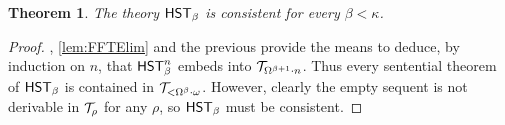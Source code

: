 \documentclass[UKenglish,cleveref,DIV=12]{scrartcl}
\newtheorem{theorem}{Theorem}[section]
\theoremstyle{definition}
\theoremstyle{definition}
\begin{document}
\begin{theorem}\label{thm:FFconsis}
 The theory $\mathsf{HST}_\beta$ is consistent for every $\beta<\kappa$.
\end{theorem}
\begin{proof}
, \cref{lem:FFTElim} and the previous  provide the means to deduce, by induction on $n$, that $\mathsf{HST}_\beta^n$ embeds into $\mathcal{T}_{\Omega^{\beta+1}\cdot n}$. Thus every sentential theorem of $\mathsf{HST}_\beta$ is contained in $\mathcal{T}_{<\Omega^\beta\cdot\omega}$. However, clearly the empty sequent is not derivable in $\mathcal{T}_\rho$ for any $\rho$, so $\mathsf{HST}_\beta$ must be consistent.
\end{proof}
%
\end{document}
